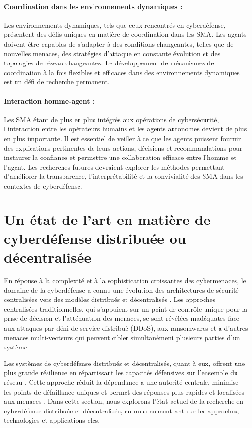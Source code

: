\paragraph{Coordination dans les environnements dynamiques :}
Les environnements dynamiques, tels que ceux rencontrés en cyberdéfense, présentent des défis uniques en matière de coordination dans les SMA. Les agents doivent être capables de s'adapter à des conditions changeantes, telles que de nouvelles menaces, des stratégies d'attaque en constante évolution et des topologies de réseau changeantes. Le développement de mécanismes de coordination à la fois flexibles et efficaces dans des environnements dynamiques est un défi de recherche permanent.

\paragraph{Interaction homme-agent :}
Les SMA étant de plus en plus intégrés aux opérations de cybersécurité, l’interaction entre les opérateurs humains et les agents autonomes devient de plus en plus importante. Il est essentiel de veiller à ce que les agents puissent fournir des explications pertinentes de leurs actions, décisions et recommandations pour instaurer la confiance et permettre une collaboration efficace entre l’homme et l’agent. Les recherches futures devraient explorer les méthodes permettant d’améliorer la transparence, l’interprétabilité et la convivialité des SMA dans les contextes de cyberdéfense.



\section{Un état de l'art en matière de cyberdéfense distribuée ou décentralisée}

En réponse à la complexité et à la sophistication croissantes des cybermenaces, le domaine de la cyberdéfense a connu une évolution des architectures de sécurité centralisées vers des modèles distribués et décentralisés \cite{Chen2021, Misra2023}. Les approches centralisées traditionnelles, qui s'appuient sur un point de contrôle unique pour la prise de décision et l'atténuation des menaces, se sont révélées inadéquates face aux attaques par déni de service distribué (DDoS), aux ransomwares et à d'autres menaces multi-vecteurs qui peuvent cibler simultanément plusieurs parties d'un système \cite{Munsing2018}.

Les systèmes de cyberdéfense distribués et décentralisés, quant à eux, offrent une plus grande résilience en répartissant les capacités défensives sur l'ensemble du réseau \cite{Oliynykov2022}. Cette approche réduit la dépendance à une autorité centrale, minimise les points de défaillance uniques et permet des réponses plus rapides et localisées aux menaces \cite{Kott2021}. Dans cette section, nous explorons l'état actuel de la recherche en cyberdéfense distribuée et décentralisée, en nous concentrant sur les approches, technologies et applications clés.


